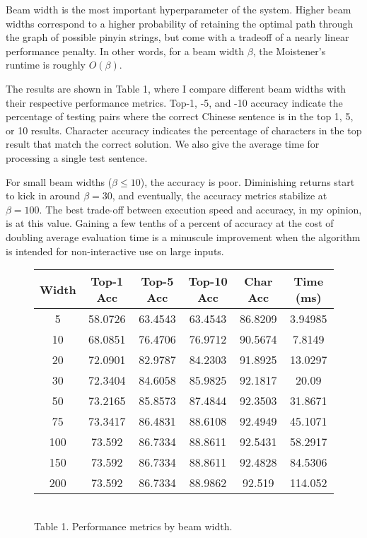 \documentclass[11pt]{ctexart}
\begin{document}
Beam width is the most important hyperparameter of the system.
Higher beam widths correspond to a higher probability of retaining the optimal path
through the graph of possible pinyin strings, but come with a tradeoff
of a nearly linear performance penalty. In other words, for a beam width $\beta$, 
the Moistener's runtime is roughly $O(\beta)$.

The results are shown in Table 1, where I compare 
different beam widths with their respective performance metrics.
Top-1, -5, and -10 accuracy indicate the percentage of testing pairs
where the correct Chinese sentence is in the top 1, 5, or 10 results.
Character accuracy indicates the percentage of characters in the top result that
match the correct solution. We also give the average time for processing
a single test sentence.  

For small beam widths ($\beta \leq 10$), the accuracy is poor.
Diminishing returns start to kick in around $\beta = 30$, 
and eventually, the accuracy metrics stabilize at $\beta = 100$.
The best trade-off between execution speed and accuracy, in my opinion,
is at this value.
Gaining a few tenths of a percent of accuracy at the cost of
doubling  average evaluation time is a minuscule improvement
when the algorithm is intended for non-interactive use on large inputs.

\begin{figure}[htp]
\centering

\begin{tabular}{ c|c|c|c|c|c } 
 Width & Top-1 Acc & Top-5 Acc & Top-10 Acc & Char Acc & Time (ms)\\ 
 \hline
5 & 58.0726 & 63.4543 & 63.4543 & 86.8209 & 3.94985 \\
10 & 68.0851 & 76.4706 & 76.9712 & 90.5674 & 7.8149 \\
20 & 72.0901 & 82.9787 & 84.2303 & 91.8925 & 13.0297 \\
30 & 72.3404 & 84.6058 & 85.9825 & 92.1817 & 20.09 \\
50 & 73.2165 & 85.8573 & 87.4844 & 92.3503 & 31.8671 \\
75 & 73.3417 & 86.4831 & 88.6108 & 92.4949 & 45.1071 \\
100 & 73.592 & 86.7334 & 88.8611 & 92.5431 & 58.2917 \\
150 & 73.592 & 86.7334 & 88.8611 & 92.4828 & 84.5306 \\
200 & 73.592 & 86.7334 & 88.9862 & 92.519 & 114.052
\end{tabular}
\\
\vspace{5mm}
Table 1. Performance metrics by beam width.

\end{figure}
\end{document}
